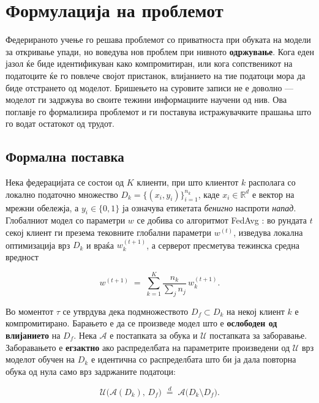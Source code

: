 \chapter{Формулација на проблемот}
\label{chap:problem}

Федерираното учење го решава проблемот со приватноста при обуката на модели за откривање
упади, но воведува нов проблем при нивното \textbf{одржување}. Кога еден јазол ќе биде
идентификуван како компромитиран, или кога сопственикот на податоците ќе го повлече
својот пристанок, влијанието на тие податоци мора да биде отстрането од моделот. Бришењето
на суровите записи не е доволно --- моделот ги задржува во своите тежини информациите
научени од нив. Ова поглавје го формализира проблемот и ги поставува истражувачките
прашања што го водат остатокот од трудот.

\section{Формална поставка}

Нека федерацијата се состои од $K$ клиенти, при што клиентот $k$ располага со локално
податочно множество $D_k = \{(x_i, y_i)\}_{i=1}^{n_k}$, каде $x_i \in \mathbb{R}^d$ е
вектор на мрежни обележја, а $y_i \in \{0, 1\}$ ја означува етикетата \emph{бенигно} наспроти
\emph{напад}. Глобалниот модел со параметри $w$ се добива со алгоритмот FedAvg
\cite{mcmahan2017fedavg}: во рундата $t$ секој клиент ги презема тековните глобални
параметри $w^{(t)}$, изведува локална оптимизација врз $D_k$ и враќа
$w_k^{(t+1)}$, а серверот пресметува тежинска средна вредност

\[
w^{(t+1)} \;=\; \sum_{k=1}^{K} \frac{n_k}{\sum_{j} n_j}\, w_k^{(t+1)} .
\]

Во моментот $\tau$ се утврдува дека подмножеството $D_f \subset D_k$ на некој клиент $k$ е
компромитирано. Барањето е да се произведе модел што е \textbf{ослободен од влијанието} на
$D_f$. Нека $\mathcal{A}$ е постапката за обука и $\mathcal{U}$ постапката за заборавање.
Заборавањето е \textbf{егзактно} ако распределбата на параметрите произведени од
$\mathcal{U}$ врз моделот обучен на $D_k$ е идентична со распределбата што би ја дала
повторна обука од нула само врз задржаните податоци:

\[
\mathcal{U}\bigl(\mathcal{A}(D_k),\, D_f\bigr) \;\stackrel{d}{=}\; \mathcal{A}\bigl(D_k \setminus D_f\bigr).
\]

